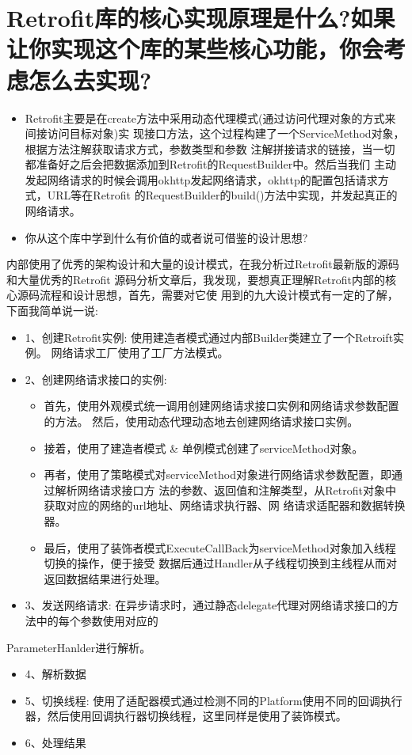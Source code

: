 \documentclass[9pt, b5paper]{article}
\begin{document}
\section{Retrofit库的核心实现原理是什么?如果让你实现这个库的某些核心功能，你会考虑怎么去实现?}
\label{sec-6}
\begin{itemize}
\item Retrofit主要是在create方法中采用动态代理模式(通过访问代理对象的方式来间接访问目标对象)实 现接口方法，这个过程构建了一个ServiceMethod对象，根据方法注解获取请求方式，参数类型和参数 注解拼接请求的链接，当一切都准备好之后会把数据添加到Retrofit的RequestBuilder中。然后当我们 主动发起网络请求的时候会调用okhttp发起网络请求，okhttp的配置包括请求方式，URL等在Retrofit 的RequestBuilder的build()方法中实现，并发起真正的网络请求。
\item 你从这个库中学到什么有价值的或者说可借鉴的设计思想?
\end{itemize}
内部使用了优秀的架构设计和大量的设计模式，在我分析过Retrofit最新版的源码和大量优秀的Retrofit 源码分析文章后，我发现，要想真正理解Retrofit内部的核心源码流程和设计思想，首先，需要对它使 用到的九大设计模式有一定的了解，下面我简单说一说:
\begin{itemize}
\item 1、创建Retrofit实例: 使用建造者模式通过内部Builder类建立了一个Retroift实例。 网络请求工厂使用了工厂方法模式。
\item 2、创建网络请求接口的实例:
\begin{itemize}
\item 首先，使用外观模式统一调用创建网络请求接口实例和网络请求参数配置的方法。 然后，使用动态代理动态地去创建网络请求接口实例。
\item 接着，使用了建造者模式 \& 单例模式创建了serviceMethod对象。
\item 再者，使用了策略模式对serviceMethod对象进行网络请求参数配置，即通过解析网络请求接口方 法的参数、返回值和注解类型，从Retrofit对象中获取对应的网络的url地址、网络请求执行器、网 络请求适配器和数据转换器。
\item 最后，使用了装饰者模式ExecuteCallBack为serviceMethod对象加入线程切换的操作，便于接受 数据后通过Handler从子线程切换到主线程从而对返回数据结果进行处理。
\end{itemize}
\item 3、发送网络请求: 在异步请求时，通过静态delegate代理对网络请求接口的方法中的每个参数使用对应的
\end{itemize}
ParameterHanlder进行解析。
\begin{itemize}
\item 4、解析数据
\item 5、切换线程: 使用了适配器模式通过检测不同的Platform使用不同的回调执行器，然后使用回调执行器切换线程，这里同样是使用了装饰模式。
\item 6、处理结果
\end{itemize}
\end{document}
